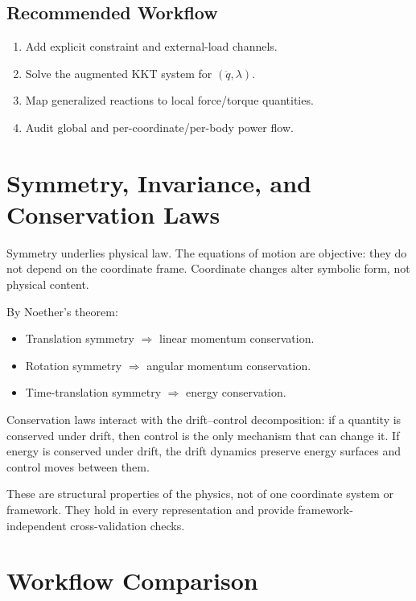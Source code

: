 \documentclass[11pt]{article}
\begin{document}
\subsection{Recommended Workflow}

\begin{enumerate}
\item Add explicit constraint and external-load channels.
\item Solve the augmented KKT system for $(\ddot{q},\lambda)$.
\item Map generalized reactions to local force/torque quantities.
\item Audit global and per-coordinate/per-body power flow.
\end{enumerate}


\section{Symmetry, Invariance, and Conservation Laws}\label{sec:symmetry}

Symmetry underlies physical law.
The equations of motion are objective: they do not depend on the coordinate frame.
Coordinate changes alter symbolic form, not physical content.

By Noether's theorem:
\begin{itemize}
\item Translation symmetry $\Rightarrow$ linear momentum conservation.
\item Rotation symmetry $\Rightarrow$ angular momentum conservation.
\item Time-translation symmetry $\Rightarrow$ energy conservation.
\end{itemize}

Conservation laws interact with the drift--control decomposition:
if a quantity is conserved under drift, then control is the only mechanism that can change it.
If energy is conserved under drift, the drift dynamics preserve energy surfaces and control moves between them.

These are structural properties of the physics, not of one coordinate system or framework.
They hold in every representation and provide framework-independent cross-validation checks.


\section{Workflow Comparison}\label{sec:workflow}
\end{document}
